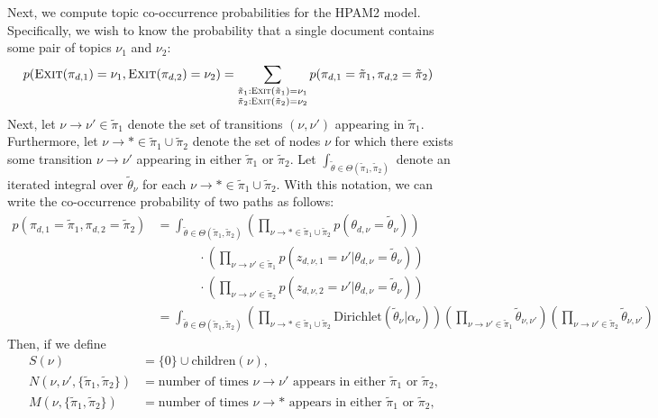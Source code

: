 \documentclass{article}
\theoremstyle{definition}
\newcommand{\Dirichlet}{\text{Dirichlet}}
\newcommand{\Exit}{\textsc{Exit}}
\begin{document}
Next, we compute topic co-occurrence probabilities for the HPAM2 model.
Specifically, we wish to know the probability that a single document contains some pair of topics $\nu_1$ and $\nu_2$:
\begin{align}
p(\Exit(\pi_{d,1}) = \nu_1,
  \Exit(\pi_{d,2}) = \nu_2)
&=
\sum_{
  \substack{
    \tilde\pi_1 : \Exit(\tilde\pi_1) = \nu_1
    \\
    \tilde\pi_2 : \Exit(\tilde\pi_2) = \nu_2
  }
}
p(\pi_{d,1} = \tilde\pi_1, \pi_{d,2} = \tilde\pi_2)
\end{align}
Next, let $\nu \to \nu' \in \tilde\pi_1$ denote the set of transitions $(\nu, \nu')$ appearing in $\tilde\pi_1$.
Furthermore, let $\nu \to * \in \tilde\pi_1 \cup \tilde\pi_2$ denote the set of nodes $\nu$ for which there exists some transition $\nu \to \nu'$ appearing in either $\tilde\pi_1$ or $\tilde\pi_2$.
Let $\int_{\tilde\theta \in \Theta(\tilde\pi_1, \tilde\pi_2)}$ denote an iterated integral over $\tilde\theta_\nu$ for each $\nu \to * \in \tilde\pi_1 \cup \tilde\pi_2$.
With this notation, we can write the co-occurrence probability of two paths as follows:
\begin{align}
p(\pi_{d,1} = \tilde\pi_1, \pi_{d,2} = \tilde\pi_2)
&=
\int_{\tilde\theta \in \Theta(\tilde\pi_1, \tilde\pi_2)}
  \left(
    \prod_{\nu \to * \in \tilde\pi_1 \cup \tilde\pi_2}
    p(\theta_{d,\nu} = \tilde\theta_\nu)
  \right)
  \\ &\phantom{=}\qquad \cdot
  \left(
    \prod_{\nu \to \nu' \in \tilde\pi_1}
    p(z_{d,\nu,1} = \nu' | \theta_{d,\nu} = \tilde\theta_\nu)
  \right)
  \\ &\phantom{=}\qquad \cdot
  \left(
    \prod_{\nu \to \nu' \in \tilde\pi_2}
    p(z_{d,\nu,2} = \nu' | \theta_{d,\nu} = \tilde\theta_\nu)
  \right)
\\
&=
\int_{\tilde\theta \in \Theta(\tilde\pi_1, \tilde\pi_2)}
  \left(
    \prod_{\nu \to * \in \tilde\pi_1 \cup \tilde\pi_2}
    \Dirichlet(\tilde\theta_\nu | \alpha_\nu)
  \right)
  \left(
    \prod_{\nu \to \nu' \in \tilde\pi_1}
    \tilde\theta_{\nu,\nu'}
  \right)
  \left(
    \prod_{\nu \to \nu' \in \tilde\pi_2}
    \tilde\theta_{\nu,\nu'}
  \right)
\end{align}
Then, if we define
\begin{align}
S(\nu) &= \{0\} \cup \text{children}(\nu), \\
N(\nu,\nu',\{\tilde\pi_1,\tilde\pi_2\}) &= \text{number of times $\nu \to \nu'$ appears in either $\tilde\pi_1$ or $\tilde\pi_2$}, \\
M(\nu,\{\tilde\pi_1,\tilde\pi_2\}) &= \text{number of times $\nu \to *$ appears in either $\tilde\pi_1$ or $\tilde\pi_2$},
\end{align}
\end{document}
